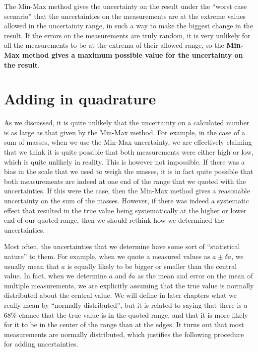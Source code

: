 The Min-Max method gives the uncertainty on the result under the ``worst case scenario'' that the uncertainties on the measurements are at the extreme values allowed in the uncertainty range, in such a way to make the biggest change in the result. If the errors on the measurements are truly random, it is very unlikely for all the measurements to be at the extrema of their allowed range, so the \textbf{Min-Max method gives a maximum possible value for the uncertainty on the result}. 

\section{Adding in quadrature}
As we discussed, it is quite unlikely that the uncertainty on a calculated number is as large as that given by the Min-Max method. For example, in the case of a sum of masses, when we use the Min-Max uncertainty, we are effectively claiming that we think it is quite possible that both measurements were either high or low, which is quite unlikely in reality. This is however not impossible. If there was a bias in the scale that we used to weigh the masses, it is in fact quite possible that both measurements are indeed at one end of the range that we quoted with the uncertainties. If this were the case, then the Min-Max method gives a reasonable uncertainty on the sum of the masses. However, if there was indeed a systematic effect that resulted in the true value being systematically at the higher or lower end of our quoted range, then we should rethink how we determined the uncertainties.

Most often, the uncertainties that we determine have some sort of ``statistical nature'' to them. For example, when we quote a measured values as $a\pm \delta a$, we usually mean that $a$ is equally likely to be bigger or smaller than the central value. In fact, when we determine $a$ and $\delta a$ as the mean and error on the mean of multiple measurements, we are explicitly assuming that the true value is normally distributed about the central value. We will define in later chapters what we really mean by ``normally distributed'', but it is related to saying that there is a 68\% chance that the true value is in the quoted range, and that it is more likely for it to be in the center of the range than at the edges. It turns out that most measurements are normally distributed, which justifies the following procedure for adding uncertainties.

